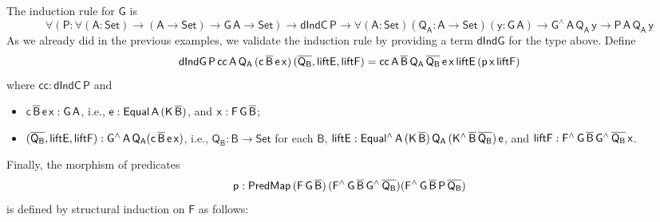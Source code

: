 \documentclass[9pt]{entcs}
\begin{document}
The induction rule for $\mathsf{G}$ is
\[
\mathsf{\forall (P : \forall (A : Set) \to (A \to Set) \to G\,A \to Set) \to dIndC\,P
\to \forall (A : Set)(Q_A : A \to Set)(y : G\,A) \to G^{\wedge}\,A\,Q_A\,y \to P\,A\,Q_A\,y}
\]
As we already did in the previous examples,
we validate the induction rule by providing a term $\mathsf{dIndG}$ for the type above.
Define
\[
\mathsf{dIndG\,P\,cc\,A\,Q_A\,(c\,\overline{B}\,e\,x)\,(\overline{Q_B}, liftE, liftF)
= cc\,A\,\overline{B}\,Q_A\,\overline{Q_B}\,e\,x\,liftE\,(p\,x\,liftF)}
\]
where $\mathsf{cc : dIndC\,P}$ and
\begin{itemize}
\item $\mathsf{c\,\overline{B}\,e\,x : G\,A}$,
i.e., $\mathsf{e : Equal\,A\,(K\,\overline{B})}$,
and $\mathsf{x : F\,G\,\overline{B}}$;
\item $\mathsf{(\overline{Q_B}, liftE, liftF) : G^{\wedge}\,A\,Q_A (c\,\overline{B}\,e\,x)}$,
i.e.,
$\mathsf{Q_B : B \to Set}$ for each $\mathsf{B}$,
$\mathsf{liftE : Equal^{\wedge}\,A\,(K\,\overline{B})\,Q_A\,(K^{\wedge}\,\overline{B}\,\overline{Q_B})\,e}$,
and $\mathsf{liftF : F^{\wedge}\,G\,\overline{B}\,G^{\wedge}\,{\overline{Q_B}}\,x}$.
\end{itemize}
Finally, the morphism of predicates
\[
\mathsf{p : PredMap\,(F\,G\,\overline{B})\,(F^{\wedge}\,G\,\overline{B}\,G^{\wedge}\,\overline{Q_B}) (F^{\wedge}\,G\,\overline{B}\,P\,\overline{Q_B})}
\]
is defined by structural induction on $\mathsf{F}$ as follows:
\end{document}
